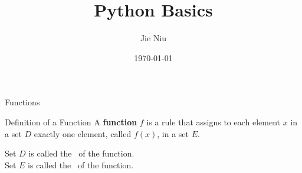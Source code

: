 \documentclass{beamer}
\title{Python Basics}
\author{Jie Niu}
\institute{IGWES, JNU}
\date{\today}
\begin{document}
\begin{frame}
\titlepage
\end{frame}

\begin{frame}[t]{Functions} \vspace{4pt}
\begin{block}{Definition of a Function}
\vspace{0.5em}
A \textbf{function} $f$ is a rule that assigns to each element $x$ in a set $D$ exactly one element, called $f(x)$, in a set $E$.
\vspace{0.5em}
\end{block}

\vspace{10pt}
Set $D$ is called the 
\, of the function.\\[10pt]

Set $E$ is called the 
\, of the function.

\end{frame}
\end{document}

